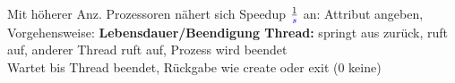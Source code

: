 Mit höherer Anz. Prozessoren nähert sich Speedup $\frac{1}{\textcolor{blue}{s}}$ an: 
Attribut angeben, Vorgehensweise:
\textbf{Lebensdauer/Beendigung Thread: }springt aus  zurück, ruft  auf, anderer Thread ruft  auf, Prozess wird beendet\\
Wartet bis Thread beendet, Rückgabe wie create oder exit (0 keine)\\


